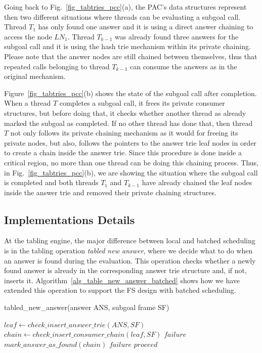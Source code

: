 \documentclass{llncs}
\begin{document}
Going back to Fig.~\ref{fig_tabtries_pcc}(a), the PAC's data
structures represent then two different situations where threads can
be evaluating a subgoal call. Thread $T_1$ has only found one answer
and it is using a direct answer chaining to access the node
$LN_1$. Thread $T_{k-1}$ was already found three answers for the
subgoal call and it is using the hash trie mechanism within its
private chaining. Please note that the answer nodes are still chained
between themselves, thus that repeated calls belonging to thread
$T_{k-1}$ can consume the answers as in the original mechanism.

Figure~\ref{fig_tabtries_pcc}(b) shows the state of the subgoal call
after completion. When a thread $T$ completes a subgoal call, it frees
its private consumer structures, but before doing that, it checks
whether another thread as already marked the subgoal as completed. If
no other thread has done that, then thread $T$ not only follows its
private chaining mechanism as it would for freeing its private nodes,
but also, follows the pointers to the answer trie leaf nodes in order
to create a chain inside the answer trie. Since this procedure is done
inside a critical region, no more than one thread can be doing this
chaining process. Thus, in Fig.~\ref{fig_tabtries_pcc}(b), we are
showing the situation where the subgoal call is completed and both
threads $T_1$ and $T_{k-1}$ have already chained the leaf nodes inside
the answer trie and removed their private chaining structures.


\subsection{Implementations Details}

At the tabling engine, the major difference between local and batched
scheduling is in the tabling operation \emph{tabled new answer}, where
we decide what to do when an answer is found during the
evaluation. This operation checks whether a newly found answer is
already in the corresponding answer trie structure and, if not,
inserts it. Algorithm~\ref{alg_table_new_answer_batched} shows how we
have extended this operation to support the FS design with batched
scheduling.

\begin{algorithm} [!ht]
\caption{tabled\_new\_answer(answer ANS, subgoal frame SF)}
\begin{algorithmic}[1]
  \STATE $leaf \gets check\_insert\_answer\_trie(ANS, SF)$
  \STATE $chain \gets check\_insert\_consumer\_chain(leaf, SF)$
    \RETURN $failure$
    \STATE $mark\_answer\_as\_found(chain)$
      \RETURN $failure$
      \RETURN $proceed$
    \ENDIF
  \ENDIF  
\end{algorithmic}
\label{alg_table_new_answer_batched}
\end{algorithm}
\end{document}
